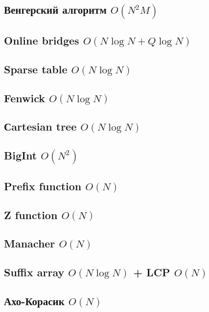 \documentclass[10pt]{article}
\begin{document}
\begin{multicols}{2}
\subsection{Венгерский алгоритм $O(N^2M)$}

\subsection{Online bridges $O(N\log{N} + Q\log{N})$}

\subsection{Sparse table $O(N\log{N})$}

\subsection{Fenwick $O(N\log{N})$}

\subsection{Сartesian tree $O(N\log{N})$}

\subsection{BigInt $O(N^2)$}

\subsection{Prefix function $O(N)$}

\subsection{Z function $O(N)$}

\subsection{Manacher $O(N)$}

\subsection{Suffix array $O(N\log{N})$ + LCP $O(N)$}

\subsection{Ахо-Корасик $O(N)$}


\end{multicols}
\end{document}
